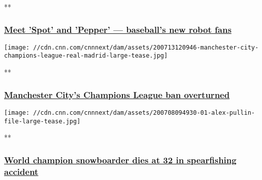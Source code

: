 **

\hypertarget{meet-spot-and-pepper--baseballs-new-robot-fans}{%
\subsubsection{\texorpdfstring{\href{/videos/sports/2020/07/10/dancing-robots-japan-baseball-coronavirus-lon-orig-naz-spt-intl.cnn/video/playlists/international-sport-playlist-general-videos/}{Meet
'Spot' and 'Pepper' --- baseball's new robot
fans}}{Meet 'Spot' and 'Pepper' --- baseball's new robot fans}}\label{meet-spot-and-pepper--baseballs-new-robot-fans}}

\href{/videos/sports/2020/07/13/manchester-city-champions-league-ban-overturned-cas-ffp-football-uefa-spt-intl.cnn/video/playlists/international-sport-playlist-general-videos/}{}

\texttt{[image: //cdn.cnn.com/cnnnext/dam/assets/200713120946-manchester-city-champions-league-real-madrid-large-tease.jpg]}

**

\hypertarget{manchester-citys-champions-league-ban-overturned}{%
\subsubsection{\texorpdfstring{\href{/videos/sports/2020/07/13/manchester-city-champions-league-ban-overturned-cas-ffp-football-uefa-spt-intl.cnn/video/playlists/international-sport-playlist-general-videos/}{Manchester
City's Champions League ban
overturned}}{Manchester City's Champions League ban overturned}}\label{manchester-citys-champions-league-ban-overturned}}

\href{/videos/sports/2020/07/08/alex-chumpy-pullin-snowboarder-dies-olympics-australia-spt-intl-lon-orig.cnn/video/playlists/international-sport-playlist-general-videos/}{}

\texttt{[image: //cdn.cnn.com/cnnnext/dam/assets/200708094930-01-alex-pullin-file-large-tease.jpg]}

**

\hypertarget{world-champion-snowboarder-dies-at-32-in-spearfishing-accident}{%
\subsubsection{\texorpdfstring{\href{/videos/sports/2020/07/08/alex-chumpy-pullin-snowboarder-dies-olympics-australia-spt-intl-lon-orig.cnn/video/playlists/international-sport-playlist-general-videos/}{World
champion snowboarder dies at 32 in spearfishing
accident}}{World champion snowboarder dies at 32 in spearfishing accident}}\label{world-champion-snowboarder-dies-at-32-in-spearfishing-accident}}

